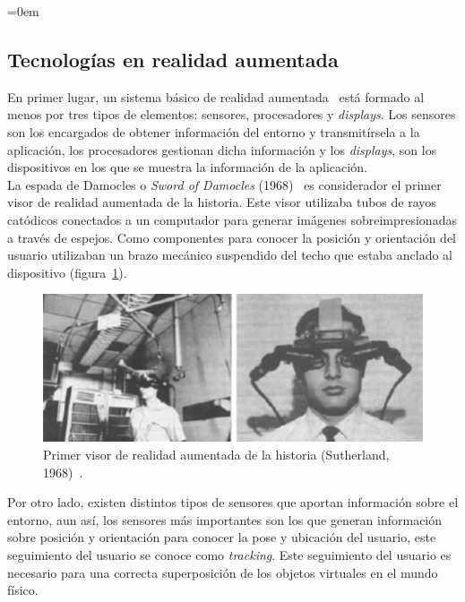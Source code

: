 \parindent=0em
\subsection{Tecnologías en realidad aumentada}
\label{techAR}
\noindent


En primer lugar, un sistema básico de realidad aumentada~\cite{arhardwarerequirements} está formado al menos por tres tipos de elementos: sensores, procesadores y \textit{displays}. Los sensores son los encargados de obtener información del entorno y transmitírsela a la aplicación, los procesadores gestionan dicha información y los \textit{displays}, son los dispositivos en los que se muestra la información de la aplicación.\\

La espada de Damocles o \textit{Sword of Damocles} (1968)~\cite{swordOfDamocles} es considerador el primer visor de realidad aumentada de la historia. Este visor utilizaba tubos de rayos catódicos conectados a un computador para generar imágenes sobreimpresionadas a través de espejos. Como componentes para conocer la posición y orientación del usuario utilizaban un brazo mecánico suspendido del techo que estaba anclado al dispositivo (figura~\ref{fig:swordOfDamocles}). 

\begin{figure}[H]
    \centering
    \includegraphics[scale=0.4]{Images/Estado del arte/The-worlds-first-head-mounted-display-with-the-Sword-of-Damocles-Sutherland-1968.png}
    \caption{Primer visor de realidad aumentada de la historia (Sutherland, 1968)~\cite{swordOfDamocles}.}
    \label{fig:swordOfDamocles}
\end{figure}

Por otro lado, existen distintos tipos de sensores que aportan información sobre el entorno, aun así, los sensores más importantes son los que generan información sobre posición y orientación para conocer la pose y ubicación del usuario, este seguimiento del usuario se conoce como \textit{tracking}. Este seguimiento del usuario es necesario para una correcta superposición de los objetos virtuales en el mundo físico.\\

